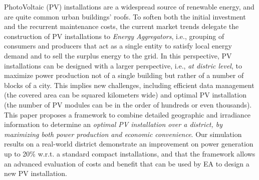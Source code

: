 PhotoVoltaic (PV) installations are a widespread source of renewable energy, and are quite common urban buildings' roofs. To soften both the initial investment and the recurrent maintenance costs, the current market trends delegate the construction of PV installations to \emph{Energy Aggregators}, i.e., grouping of consumers and producers that act as a single entity to satisfy local energy demand and to sell the surplus energy to the grid. In this perspective, PV installations can be designed with a larger perspective, i.e., \emph{at distric level}, to maximize power production not of a single building but rather of a number of blocks of a city. This implies new challenges, including efficient data management (the covered area can be squared kilometers wide) and optimal PV installation (the number of PV modules can be in the order of hundreds or even thousands). This paper proposes a framework to combine detailed geographic and irradiance information to determine an \emph{optimal PV installation over a district, by maximizing both power production and economic convenience}. Our simulation results on a real-world district demonstrate an improvement on power generation up to 20\%  w.r.t. a standard compact installations, and that the framework allows an advanced evaluation of costs and benefit that can be used by EA to design a new PV installation. 